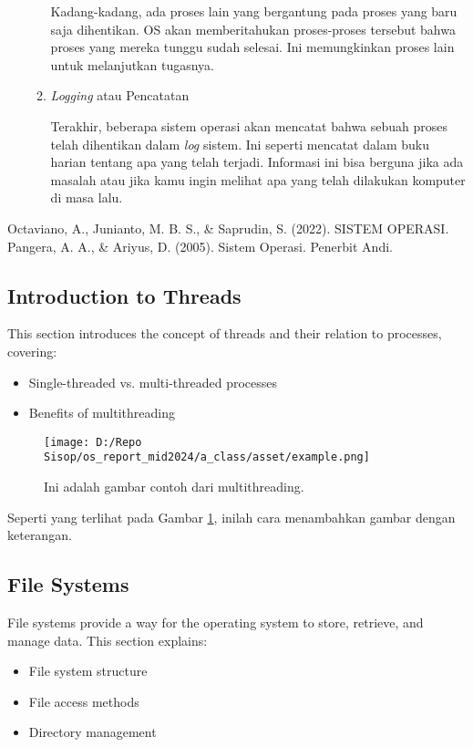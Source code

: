 \documentclass[12pt]{article}
\begin{document}
\begin{itemize}
\begin{enumerate}
        Kadang-kadang, ada proses lain yang bergantung pada proses 
        yang baru saja dihentikan. OS akan memberitahukan proses-proses 
        tersebut bahwa proses yang mereka tunggu sudah selesai. 
        Ini memungkinkan proses lain untuk melanjutkan tugasnya.

        \item  \textit{Logging} atau Pencatatan
        

        Terakhir, beberapa sistem operasi akan mencatat bahwa 
        sebuah proses telah dihentikan dalam \textit{log} sistem. Ini 
        seperti mencatat dalam buku harian tentang apa yang telah 
        terjadi. Informasi ini bisa berguna jika ada masalah atau
        jika kamu ingin melihat apa yang telah dilakukan komputer 
        di masa lalu. 
    \end{enumerate}
\end{itemize}
\begin{thebibliography}{99}
    \bibitem{}
    Octaviano, A., Junianto, M. B. S., \& Saprudin, S. (2022). SISTEM OPERASI.
    \bibitem{}
    Pangera, A. A., \& Ariyus, D. (2005). Sistem Operasi. Penerbit Andi.
\end{thebibliography}

\subsection{Introduction to Threads}
This section introduces the concept of threads and their relation to processes, covering:
\begin{itemize}
    \item Single-threaded vs. multi-threaded processes
    \item Benefits of multithreading
\end{itemize}

\begin{figure}[h]
    \centering
    \texttt{[image: D:/Repo Sisop/os\_report\_mid2024/a\_class/asset/example.png]}  %
    \caption{Ini adalah gambar contoh dari multithreading.}
    \label{fig:contoh_gambar}
\end{figure}

Seperti yang terlihat pada Gambar \ref{fig:contoh_gambar}, inilah cara menambahkan gambar dengan keterangan.

\subsection{File Systems}
File systems provide a way for the operating system to store, retrieve, and manage data. This section explains:
\begin{itemize}
    \item File system structure
    \item File access methods
    \item Directory management
\end{itemize}
\end{document}
